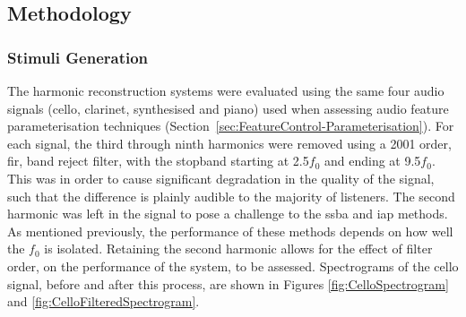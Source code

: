 	\subsection{Methodology}
	\label{sec:PerceptualExperiments-Reconstruction-Methodology}
		\subsubsection*{Stimuli Generation}
			The harmonic reconstruction systems were evaluated using the same four audio signals (cello,
			clarinet, synthesised and piano) used when assessing audio feature parameterisation techniques
			(Section~\ref{sec:FeatureControl-Parameterisation}). For each signal, the third through ninth
			harmonics were removed using a 2001 order, \acrshort{fir}, band reject filter, with the
			stopband starting at 2.5$f_{0}$ and ending at 9.5$f_{0}$. This was in order to cause significant
			degradation in the quality of the signal, such that the difference is plainly audible to the
			majority of listeners. The second harmonic was left in the signal to pose a challenge to the
			\acrshort{ssba} and \acrshort{iap} methods. As mentioned previously, the performance of these
			methods depends on how well the $f_{0}$ is isolated.  Retaining the second harmonic allows for the
			effect of filter order, on the performance of the system, to be assessed. Spectrograms of the cello
			signal, before and after this process, are shown in Figures \ref{fig:CelloSpectrogram} and
			\ref{fig:CelloFilteredSpectrogram}. 


